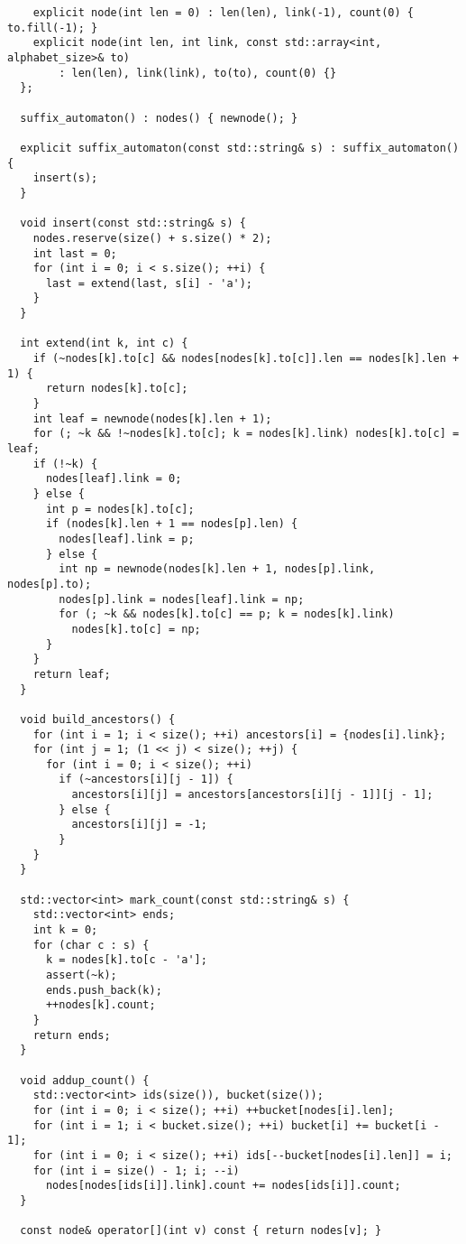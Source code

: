 \documentclass{article}
\begin{document}
\begin{lstlisting}
    explicit node(int len = 0) : len(len), link(-1), count(0) { to.fill(-1); }
    explicit node(int len, int link, const std::array<int, alphabet_size>& to)
        : len(len), link(link), to(to), count(0) {}
  };

  suffix_automaton() : nodes() { newnode(); }

  explicit suffix_automaton(const std::string& s) : suffix_automaton() {
    insert(s);
  }

  void insert(const std::string& s) {
    nodes.reserve(size() + s.size() * 2);
    int last = 0;
    for (int i = 0; i < s.size(); ++i) {
      last = extend(last, s[i] - 'a');
    }
  }

  int extend(int k, int c) {
    if (~nodes[k].to[c] && nodes[nodes[k].to[c]].len == nodes[k].len + 1) {
      return nodes[k].to[c];
    }
    int leaf = newnode(nodes[k].len + 1);
    for (; ~k && !~nodes[k].to[c]; k = nodes[k].link) nodes[k].to[c] = leaf;
    if (!~k) {
      nodes[leaf].link = 0;
    } else {
      int p = nodes[k].to[c];
      if (nodes[k].len + 1 == nodes[p].len) {
        nodes[leaf].link = p;
      } else {
        int np = newnode(nodes[k].len + 1, nodes[p].link, nodes[p].to);
        nodes[p].link = nodes[leaf].link = np;
        for (; ~k && nodes[k].to[c] == p; k = nodes[k].link)
          nodes[k].to[c] = np;
      }
    }
    return leaf;
  }

  void build_ancestors() {
    for (int i = 1; i < size(); ++i) ancestors[i] = {nodes[i].link};
    for (int j = 1; (1 << j) < size(); ++j) {
      for (int i = 0; i < size(); ++i)
        if (~ancestors[i][j - 1]) {
          ancestors[i][j] = ancestors[ancestors[i][j - 1]][j - 1];
        } else {
          ancestors[i][j] = -1;
        }
    }
  }

  std::vector<int> mark_count(const std::string& s) {
    std::vector<int> ends;
    int k = 0;
    for (char c : s) {
      k = nodes[k].to[c - 'a'];
      assert(~k);
      ends.push_back(k);
      ++nodes[k].count;
    }
    return ends;
  }

  void addup_count() {
    std::vector<int> ids(size()), bucket(size());
    for (int i = 0; i < size(); ++i) ++bucket[nodes[i].len];
    for (int i = 1; i < bucket.size(); ++i) bucket[i] += bucket[i - 1];
    for (int i = 0; i < size(); ++i) ids[--bucket[nodes[i].len]] = i;
    for (int i = size() - 1; i; --i)
      nodes[nodes[ids[i]].link].count += nodes[ids[i]].count;
  }

  const node& operator[](int v) const { return nodes[v]; }


\end{lstlisting}
\end{document}
